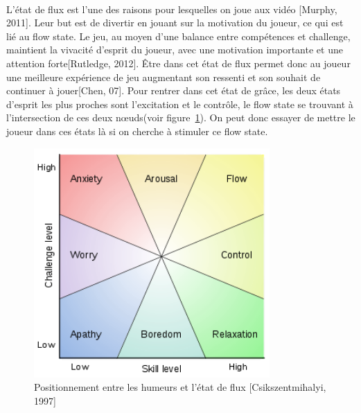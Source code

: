 \paragraph{}
L’état de flux est l’une des raisons pour lesquelles on joue aux vidéo [Murphy, 2011]\cite{Murp11}. Leur but est de divertir en jouant sur la motivation du joueur, ce qui est lié au flow state. Le jeu, au moyen d’une balance entre compétences et challenge, maintient la vivacité d’esprit du joueur, avec une motivation importante et une attention forte[Rutledge, 2012]\cite{Rutl12}. Être dans cet état de flux permet donc au joueur une meilleure expérience de jeu augmentant son ressenti et son souhait de continuer à jouer[Chen, 07]\cite{Chen07}. Pour rentrer dans cet état de grâce, les deux états d’esprit les plus proches sont l’excitation et le contrôle, le flow state se trouvant à l’intersection de ces deux nœuds(voir figure~\ref{state_of_flow}). On peut donc essayer de mettre le joueur dans ces états là si on cherche à stimuler ce flow state.
\begin{figure}[h!]
	\centering
	\includegraphics[width=9cm]{images/state_of_flow.png}
	\caption{Positionnement entre les humeurs et l'état de flux [Csikszentmihalyi, 1997]\cite{Csik97}}
	\label{state_of_flow}
\end{figure}

